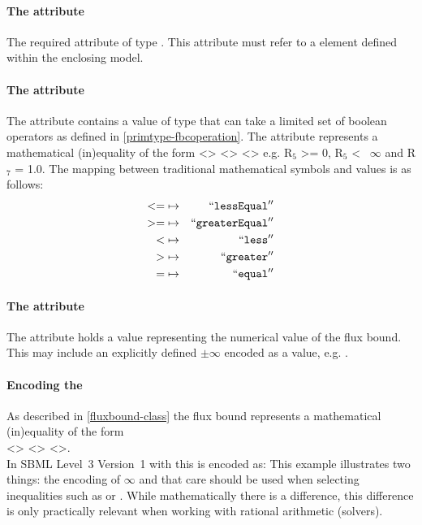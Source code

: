 \paragraph{The  attribute}
The required  attribute of type . This attribute must refer to a \Reaction element defined within the enclosing model.

\paragraph{The  attribute}
The  attribute contains a value of type
 that can take a limited set of boolean operators as
defined in \ref{primtype-fbcoperation}. The  attribute
represents a mathematical (in)equality of the form <>
<> <> e.g. R$_{5}$
>= 0, R$_{5}$ <~ $\infty$ and R$_{7}$ = 1.0. The mapping between traditional
mathematical symbols and  values is as follows:
\begin{eqnarray*}
\label{fb-operation-enum}
 \nonumber
  <= & \mapsto & ``\textcolor{black}{\textup{\ttfamily{lessEqual}}}''\\
  >= & \mapsto & ``\textcolor{black}{\textup{\ttfamily{greaterEqual}}}''\\
  < & \mapsto & ``\textcolor{black}{\textup{\ttfamily{less}}}''\\
  > & \mapsto & ``\textcolor{black}{\textup{\ttfamily{greater}}}''\\
  = & \mapsto & ``\textcolor{black}{\textup{\ttfamily{equal}}}''
\end{eqnarray*}

\paragraph{The  attribute}
The  attribute holds a  value representing the
numerical value of the flux bound. This may include an explicitly defined
$\pm\infty$ encoded as a value, e.g. .

\paragraph{Encoding the \FluxBound}
As described in \ref{fluxbound-class} the flux bound represents a
mathematical (in)equality of the form\\ <> <>
<>.\\ In SBML Level~3 Version~1 with \FBC this is encoded as:
%
%
This example illustrates two things: the encoding of $\infty$ and that care
should be used when selecting inequalities such as  or
. While mathematically there is a difference, this difference
is only practically relevant when working with rational arithmetic
(solvers).

